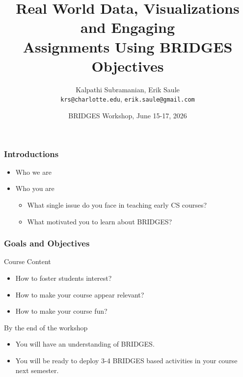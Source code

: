 \documentclass[aspectratio=169]{beamer}
\title[Objectives]{Real World Data, Visualizations and Engaging \\Assignments Using BRIDGES\vspace*{0.05in}\\Objectives}
\subtitle{}
\author{Kalpathi Subramanian, Erik Saule\\\texttt{krs@charlotte.edu}, \texttt{erik.saule@gmail.com}}
\institute{The University of North Carolina at Charlotte}
\date{BRIDGES Workshop, June 15-17, 2026}
\begin{document}
\begin{frame}
\titlepage

\end{frame}


\begin{frame}
  \frametitle{Introductions}

  \begin{itemize}
  \item Who we are
  \item Who you are
	\begin{itemize}
		\item What single issue do you face in teaching early CS courses?
		\item What motivated you to learn about BRIDGES?
	\end{itemize}
  \end{itemize}
\end{frame}

\begin{frame}
  \frametitle{Goals and Objectives}


    
    \begin{block}{Course Content}
      \begin{itemize}
      \item How to foster students interest?
      \item How to make your course appear relevant?
      \item How to make your course fun?
      \end{itemize}
    \end{block}


  \begin{block}{By the end of the workshop}
    \begin{itemize}
    \item You will have an understanding of BRIDGES.
    \item You will be ready to deploy 3-4 BRIDGES based activities 
			in your course next semester.
    \end{itemize}
  \end{block}

  
\end{frame}
\end{document}
